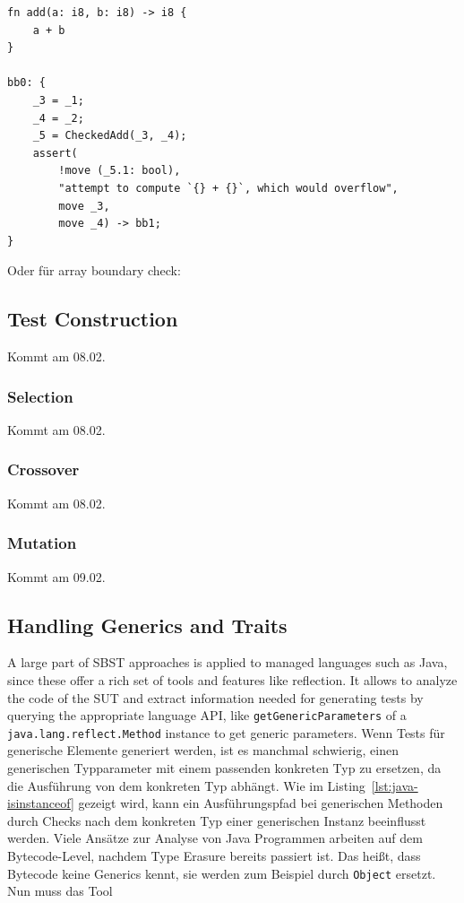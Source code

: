 \documentclass{article}
\begin{document}
\begin{lstlisting}[language={}, style=boxed, caption={\ac{MIR} overflow check}, label=lst:mir-overflow-check]
fn add(a: i8, b: i8) -> i8 {
    a + b
}

bb0: {
    _3 = _1;
    _4 = _2;
    _5 = CheckedAdd(_3, _4);
    assert(
        !move (_5.1: bool),
        "attempt to compute `{} + {}`, which would overflow",
        move _3,
        move _4) -> bb1;
}
\end{lstlisting}

Oder für array boundary check:


\subsection{Test Construction}
Kommt am 08.02.

\subsubsection{Selection}
Kommt am 08.02.

\subsubsection{Crossover}
Kommt am 08.02.

\subsubsection{Mutation}
Kommt am 09.02.


\subsection{Handling Generics and Traits}
A large part of \ac{SBST} approaches is applied to managed languages such as Java, since these offer a rich set of tools and features like reflection. It allows to analyze the code of the \ac{SUT} and extract information needed for generating tests by querying the appropriate language \ac{API}, like \lstinline{getGenericParameters} of a \lstinline{java.lang.reflect.Method} instance to get generic parameters. Wenn Tests für generische Elemente generiert werden, ist es manchmal schwierig, einen generischen Typparameter mit einem passenden konkreten Typ zu ersetzen, da die Ausführung von dem konkreten Typ abhängt. Wie im Listing~\ref{lst:java-isinstanceof} gezeigt wird, kann ein Ausführungspfad bei generischen Methoden durch Checks nach dem konkreten Typ einer generischen Instanz beeinflusst werden. Viele Ansätze zur Analyse von Java Programmen arbeiten auf dem Bytecode-Level, nachdem Type Erasure bereits passiert ist. Das heißt, dass Bytecode keine Generics kennt, sie werden zum Beispiel durch \lstinline{Object} ersetzt. Nun muss das Tool
\end{document}
